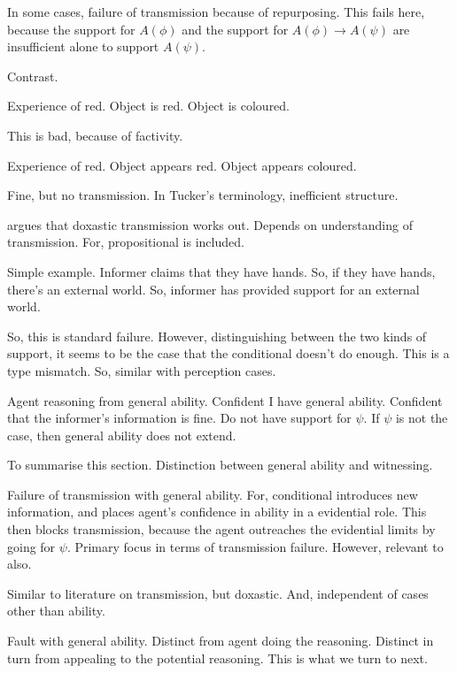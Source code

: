 \documentclass[10pt]{article}
\begin{document}
\begin{note}[Repurposing]
  In some cases, failure of transmission because of repurposing.
  This fails here, because the support for \(A(\phi)\) and the support for \(A(\phi) \rightarrow A(\psi)\) are insufficient alone to support \(A(\psi)\).

  Contrast.

  Experience of red.
  Object is red.
  Object is coloured.

  This is bad, because of factivity.

  Experience of red.
  Object appears red.
  Object appears coloured.

  Fine, but no transmission.
  In Tucker's terminology, inefficient structure.

  \citeauthor{Tucker:2010wn} argues that doxastic transmission works out.
  Depends on understanding of transmission.
  For, propositional is included.
\end{note}

Simple example.
Informer claims that they have hands.
So, if they have hands, there's an external world.
So, informer has provided support for an external world.


So, this is standard failure.
However, distinguishing between the two kinds of support, it seems to be the case that the conditional doesn't do enough.
This is a type mismatch.
So, similar with perception cases.


\begin{note}
  Agent reasoning from general ability.
  Confident I have general ability.
  Confident that the informer's information is fine.
  Do not have support for \(\psi\).
  If \(\psi\) is not the case, then general ability does not extend.
  
\end{note}


\begin{note}[Summary]
  To summarise this section.
  Distinction between general ability and witnessing.

  Failure of transmission with general ability.
  For, conditional introduces new information, and places agent's confidence in ability in a evidential role.
  This then blocks transmission, because the agent outreaches the evidential limits by going for \(\psi\).
  Primary focus in terms of transmission failure.
  However, relevant to \citeauthor{Harman:1973ww} also.

  Similar to literature on transmission, but doxastic.
  And, independent of cases other than ability.

  Fault with general ability.
  Distinct from agent doing the reasoning.
  Distinct in turn from appealing to the potential reasoning.
  This is what we turn to next.
\end{note}
\end{document}
